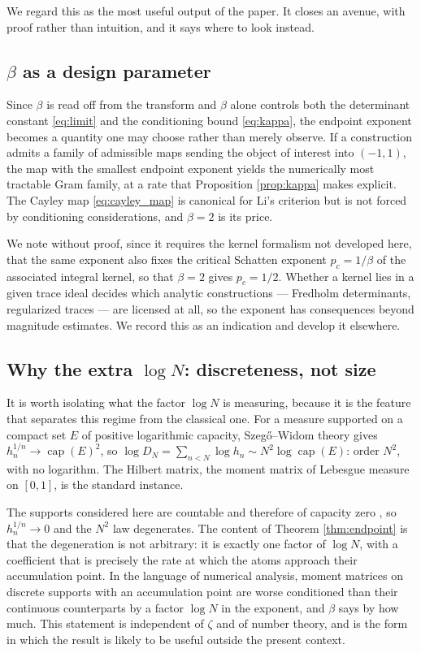\documentclass[11pt]{amsart}
\numberwithin{equation}{section}
\theoremstyle{plain}
\theoremstyle{definition}
\theoremstyle{remark}
\begin{document}
We regard this as the most useful output of the paper. It closes an avenue, with proof rather than
intuition, and it says where to look instead.

\subsection{$\beta$ as a design parameter}

Since $\beta$ is read off from the transform and $\beta$ alone controls both the determinant
constant \eqref{eq:limit} and the conditioning bound \eqref{eq:kappa}, the endpoint exponent
becomes a quantity one may choose rather than merely observe. If a construction admits a family of
admissible maps sending the object of interest into $(-1,1)$, the map with the smallest endpoint
exponent yields the numerically most tractable Gram family, at a rate that
Proposition \ref{prop:kappa} makes explicit. The Cayley map \eqref{eq:cayley_map} is canonical for
Li's criterion but is not forced by conditioning considerations, and $\beta=2$ is its price.

We note without proof, since it requires the kernel formalism not developed here, that the same
exponent also fixes the critical Schatten exponent $p_{c}=1/\beta$ of the associated integral
kernel, so that $\beta=2$ gives $p_{c}=1/2$. Whether a kernel lies in a given trace ideal decides
which analytic constructions --- Fredholm determinants, regularized traces --- are licensed at all,
so the exponent has consequences beyond magnitude estimates. We record this as an indication and
develop it elsewhere.

\subsection{Why the extra $\log N$: discreteness, not size}

It is worth isolating what the factor $\log N$ is measuring, because it is the feature that
separates this regime from the classical one. For a measure supported on a compact set $E$ of
positive logarithmic capacity, Szeg\H o--Widom theory gives $h_{n}^{1/n}\to\operatorname{cap}(E)^{2}$,
so $\log D_{N}=\sum_{n<N}\log h_{n}\sim N^{2}\log\operatorname{cap}(E)$: order $N^{2}$, with no
logarithm. The Hilbert matrix, the moment matrix of Lebesgue measure on $[0,1]$, is the standard
instance.

The supports considered here are countable and therefore of capacity zero
\cite{StahlTotik1992,Totik2005Orthogonal}, so $h_{n}^{1/n}\to0$ and the $N^{2}$ law degenerates. The
content of Theorem \ref{thm:endpoint} is that the degeneration is not arbitrary: it is exactly one
factor of $\log N$, with a coefficient that is precisely the rate at which the atoms approach their
accumulation point. In the language of numerical analysis, moment matrices on discrete supports
with an accumulation point are worse conditioned than their continuous counterparts by a factor
$\log N$ in the exponent, and $\beta$ says by how much. This statement is independent of $\zeta$ and
of number theory, and is the form in which the result is likely to be useful outside the present
context.
\end{document}
